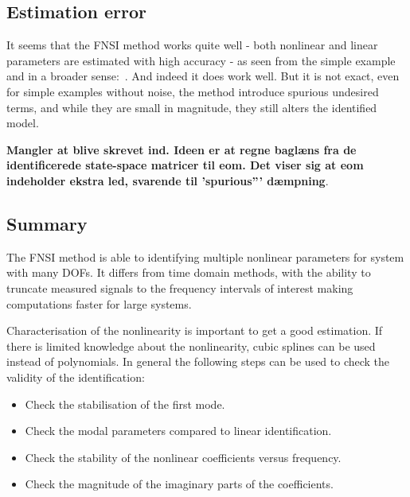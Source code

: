 \subsection{Estimation error}
\label{sec:fnsi-estimation-error}

It seems that the FNSI method works quite well - both nonlinear and linear
parameters are estimated with high accuracy - as seen from the simple example
and in a broader sense:~\autocites{noel2013a, noel2014a, noel2014b,
  noel2012time, gourc2016a}. And indeed it does work well. But it is not exact,
even for simple examples without noise, the method introduce spurious undesired
terms, and while they are small in magnitude, they still alters the identified
model.

\textbf{Mangler at blive skrevet ind. Ideen er at regne baglæns fra de
  identificerede state-space matricer til eom. Det viser sig at eom indeholder
  ekstra led, svarende til 'spurious''' dæmpning}.


\subsection{Summary}
\label{sec:summary-fnsi}

The FNSI method is able to identifying multiple nonlinear parameters for system
with many DOFs. It differs from time domain methods, with the ability to
truncate measured signals to the frequency intervals of interest making
computations faster for large systems.

Characterisation of the nonlinearity is important to get a good estimation.
If there is limited knowledge about the nonlinearity, cubic splines can be used
instead of polynomials.
In general the following steps can be used to check the validity of the
identification:

\begin{itemize}
\item Check the stabilisation of the first mode.
\item Check the modal parameters compared to linear identification.
\item Check the stability of the nonlinear coefficients versus frequency.
\item Check the magnitude of the imaginary parts of the coefficients.
\end{itemize}


